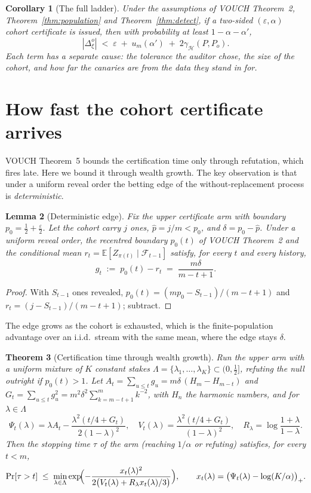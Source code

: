 \documentclass[11pt]{article}
\newtheorem{theorem}{Theorem}
\newtheorem{corollary}[theorem]{Corollary}
\newtheorem{lemma}[theorem]{Lemma}
\theoremstyle{definition}
\theoremstyle{remark}
\newcommand{\eps}{\varepsilon}
\newcommand{\E}{\mathbb{E}}
\newcommand{\F}{\mathcal{F}}
\begin{document}
\begin{corollary}[The full ladder]\label{cor:ladder}
Under the assumptions of VOUCH Theorem~2, Theorem~\ref{thm:population} and
Theorem~\ref{thm:detect}, if a two-sided $(\eps,\alpha)$ cohort certificate is issued,
then with probability at least $1-\alpha-\alpha'$,
\[
|\Delta^o_\xi| \;<\; \eps \;+\; u_m(\alpha') \;+\; 2\gamma_{\mathcal H}(P,P_o).
\]
Each term has a separate cause: the tolerance the auditor chose, the size of the
cohort, and how far the canaries are from the data they stand in for.
\end{corollary}

\section{How fast the cohort certificate arrives}

VOUCH Theorem~5 bounds the certification time only through refutation, which fires
late. Here we bound it through wealth growth. The key observation is that under a
uniform reveal order the betting edge of the without-replacement process is
\emph{deterministic}.

\begin{lemma}[Deterministic edge]\label{lem:edge}
Fix the upper certificate arm with boundary $p_0=\frac12+\frac\eps2$. Let the cohort
carry $j$ ones, $\hat p=j/m<p_0$, and $\delta=p_0-\hat p$. Under a uniform reveal
order, the recentred boundary $p_0(t)$ of VOUCH Theorem~2 and the conditional mean
$r_t=\E[Z_{\pi(t)}\mid\F_{t-1}]$ satisfy, for every $t$ and every history,
\[
g_t \;:=\; p_0(t) - r_t \;=\; \frac{m\delta}{m-t+1}.
\]
\end{lemma}

\begin{proof}
With $S_{t-1}$ ones revealed, $p_0(t)=(mp_0-S_{t-1})/(m-t+1)$ and
$r_t=(j-S_{t-1})/(m-t+1)$; subtract.
\end{proof}

The edge grows as the cohort is exhausted, which is the finite-population advantage
over an i.i.d.\ stream with the same mean, where the edge stays $\delta$.

\begin{theorem}[Certification time through wealth growth]\label{thm:growth}
Run the upper arm with a uniform mixture of $K$ constant stakes
$\Lambda=\{\lambda_1,\dots,\lambda_K\}\subset(0,\frac12]$, refuting the null outright
if $p_0(t)>1$. Let
$A_t=\sum_{u\le t}g_u=m\delta\,(H_m-H_{m-t})$ and
$G_t=\sum_{u\le t}g_u^2=m^2\delta^2\sum_{k=m-t+1}^{m}k^{-2}$, with $H_n$ the
harmonic numbers, and for $\lambda\in\Lambda$
\[
\Psi_t(\lambda)=\lambda A_t-\frac{\lambda^2(t/4+G_t)}{2(1-\lambda)^2},\quad
V_t(\lambda)=\frac{\lambda^2(t/4+G_t)}{(1-\lambda)^2},\quad
R_\lambda=\log\frac{1+\lambda}{1-\lambda}.
\]
Then the stopping time $\tau$ of the arm (reaching $1/\alpha$ or refuting) satisfies,
for every $t<m$,
\[
\Pr[\tau>t]\;\le\;\min_{\lambda\in\Lambda}
\exp\!\Bigl(-\frac{x_t(\lambda)^2}{2\bigl(V_t(\lambda)+R_\lambda x_t(\lambda)/3\bigr)}\Bigr),
\qquad x_t(\lambda)=\bigl(\Psi_t(\lambda)-\log(K/\alpha)\bigr)_+ .
\]
\end{theorem}
\end{document}
